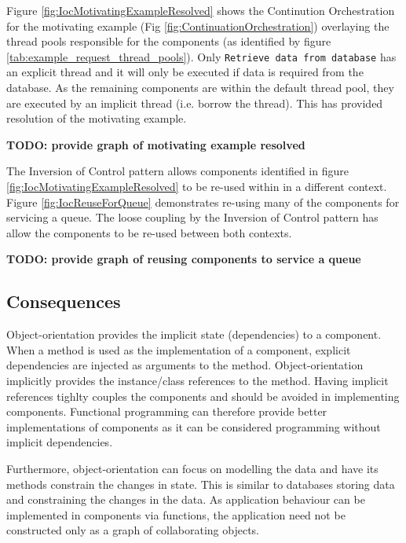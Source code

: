 \documentclass[prodmode]{style/acmlarge}
\begin{document}
Figure \ref{fig:IocMotivatingExampleResolved} shows the Continution
Orchestration for the motivating example (Fig
\ref{fig:ContinuationOrchestration}) overlaying the thread pools responsible for
the components (as identified by figure \ref{tab:example_request_thread_pools}).
 Only \texttt{Retrieve data from database} has an explicit thread and it will
only be executed if data is required from the database.  As the remaining components are within
the default thread pool, they are executed by an implicit thread (i.e. borrow the
thread).  This has provided resolution of the motivating example.

\textbf{TODO: provide graph of motivating example resolved}

The Inversion of Control pattern allows components identified in figure
\ref{fig:IocMotivatingExampleResolved} to be re-used within in a different
context. Figure \ref{fig:IocReuseForQueue} demonstrates re-using many of the
components for servicing a queue.  The loose coupling by the Inversion of
Control pattern has allow the components to be re-used between both contexts.

\textbf{TODO: provide graph of reusing components to service a queue}


\subsection{Consequences}

Object-orientation provides the implicit state (dependencies) to a component.
When a method is used as the implementation of a component, explicit
dependencies are injected as arguments to the method.  Object-orientation
implicitly provides the instance/class references to the method.  Having
implicit references tighlty couples the components and should be avoided in
implementing components.  Functional programming can therefore provide better
implementations of components as it can be considered programming without
implicit dependencies.

Furthermore, object-orientation can focus on modelling the data and have its
methods constrain the changes in state.  This is similar to databases storing
data and constraining the changes in the data.  As application behaviour can be
implemented in components via functions, the application need not be constructed
only as a graph of collaborating objects.
\end{document}
